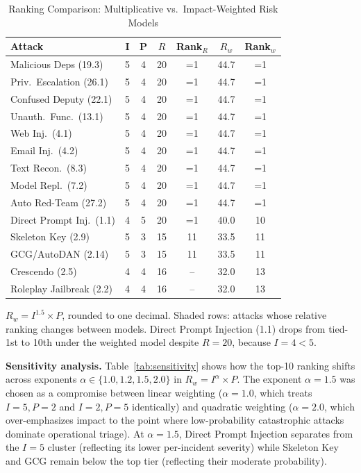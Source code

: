 \documentclass[conference]{IEEEtran}
\newcommand{\tableheaderrow}{\rowcolor{accentblue}}
\renewcommand{\thead}[1]{\textbf{\color{white}\sffamily #1}}
\begin{document}
\begin{table}[!htbp]
\centering
\caption{Ranking Comparison: Multiplicative vs.\ Impact-Weighted Risk Models}
\label{tab:weighted_comparison}
\renewcommand{\arraystretch}{1.05}
\scriptsize
\begin{tabular}{p{2.3cm}cccccc}
\toprule
\tableheaderrow \thead{Attack} & \thead{I} & \thead{P} & \thead{$R$} & \thead{Rank$_R$} & \thead{$R_w$} & \thead{Rank$_w$} \\
\midrule
Malicious Deps (19.3) & 5 & 4 & 20 & =1 & 44.7 & =1 \\
Priv.\ Escalation (26.1) & 5 & 4 & 20 & =1 & 44.7 & =1 \\
Confused Deputy (22.1) & 5 & 4 & 20 & =1 & 44.7 & =1 \\
Unauth.\ Func.\ (13.1) & 5 & 4 & 20 & =1 & 44.7 & =1 \\
Web Inj.\ (4.1) & 5 & 4 & 20 & =1 & 44.7 & =1 \\
Email Inj.\ (4.2) & 5 & 4 & 20 & =1 & 44.7 & =1 \\
Text Recon.\ (8.3) & 5 & 4 & 20 & =1 & 44.7 & =1 \\
Model Repl.\ (7.2) & 5 & 4 & 20 & =1 & 44.7 & =1 \\
\rowcolor{accentlight} Auto Red-Team (27.2) & 5 & 4 & 20 & =1 & 44.7 & =1 \\
\rowcolor{accentlight} Direct Prompt Inj.\ (1.1) & 4 & 5 & 20 & =1 & 40.0 & 10 \\
\midrule
\rowcolor{rowalt} Skeleton Key (2.9) & 5 & 3 & 15 & 11 & 33.5 & 11 \\
\rowcolor{rowalt} GCG/AutoDAN (2.14) & 5 & 3 & 15 & 11 & 33.5 & 11 \\
Crescendo (2.5) & 4 & 4 & 16 & -- & 32.0 & 13 \\
Roleplay Jailbreak (2.2) & 4 & 4 & 16 & -- & 32.0 & 13 \\
\bottomrule
\end{tabular}
\begin{tablenotes}
\scriptsize
\item $R_w = I^{1.5} \times P$, rounded to one decimal. Shaded rows: attacks whose relative ranking changes between models. Direct Prompt Injection (1.1) drops from tied-1st to 10th under the weighted model despite $R{=}20$, because $I{=}4 < 5$.
\end{tablenotes}
\end{table}

\textbf{Sensitivity analysis.} Table~\ref{tab:sensitivity} shows how the top-10 ranking shifts across exponents $\alpha \in \{1.0, 1.2, 1.5, 2.0\}$ in $R_w = I^{\alpha} \times P$. The exponent $\alpha = 1.5$ was chosen as a compromise between linear weighting ($\alpha=1.0$, which treats $I{=}5,P{=}2$ and $I{=}2,P{=}5$ identically) and quadratic weighting ($\alpha=2.0$, which over-emphasizes impact to the point where low-probability catastrophic attacks dominate operational triage). At $\alpha=1.5$, Direct Prompt Injection separates from the $I{=}5$ cluster (reflecting its lower per-incident severity) while Skeleton Key and GCG remain below the top tier (reflecting their moderate probability).
\end{document}
